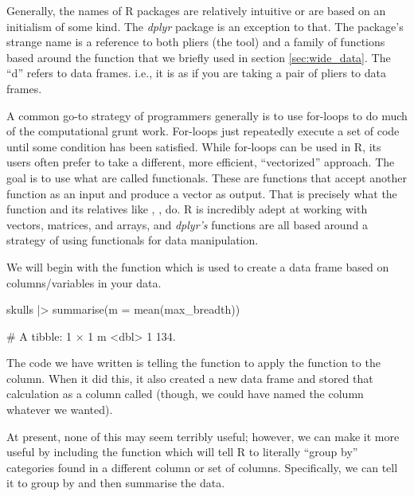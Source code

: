 \begin{mdframed}[nobreak = true, style = miscFrame, frametitle = \Large\IMFellEnglish Box 3.1: Why is it called \textit{dplyr}?]
\color{darkgray}
\IMFellEnglish

Generally, the names of R packages are relatively intuitive or are based on an initialism of some kind. The \textit{dplyr} package is an exception to that. The package's strange name is a reference to both pliers (the tool) and a family of functions based around the  function that we briefly used in section \ref{sec:wide_data}. The \enquote{d} refers to data frames. i.e., it is as if you are taking a pair of pliers to data frames.

A common go-to strategy of programmers generally is to use for-loops to do much of the computational grunt work. For-loops just repeatedly execute a set of code until some condition has been satisfied. While for-loops can be used in R, its users often prefer to take a different, more efficient, \enquote{vectorized} approach. The goal is to use what are called \glspl{functional}. These are functions that accept another function as an input and produce a vector as output. That is precisely what the  function and its relatives like , ,  do. R is incredibly adept at working with vectors, matrices, and arrays, and \textit{dplyr's} functions are all based around a strategy of using functionals for data manipulation.
\end{mdframed}

We will begin with the  function which is used to create a data frame based on columns/variables in your data.

\begin{inR}
skulls |> 
  summarise(m = mean(max_breadth))
\end{inR}

\begin{outR}
# A tibble: 1 × 1
      m
  <dbl>
1  134.
\end{outR}

The code we have written is telling the  function to apply the  function to the  column. When it did this, it also created a new data frame and stored that calculation as a column called  (though, we could have named the column whatever we wanted).

At present, none of this may seem terribly useful; however, we can make it more useful by including the  function which will tell R to literally ``group by'' categories found in a different column or set of columns. Specifically, we can tell it to group by  and then summarise the data.

